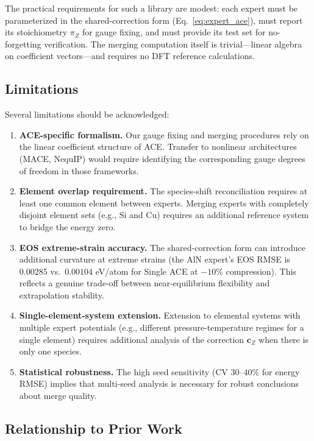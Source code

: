 \documentclass[twoside,prb,aps,floatfix,superscriptaddress,longbibliography]{revtex4-2}
\newcommand{\cZ}{\mathbf{c}_{Z}}
\begin{document}
The practical requirements for such a library are modest: each expert must be parameterized in the shared-correction form (Eq.~\eqref{eq:expert_ace}), must report its stoichiometry $\pi_Z$ for gauge fixing, and must provide its test set for no-forgetting verification. The merging computation itself is trivial---linear algebra on coefficient vectors---and requires no DFT reference calculations.

\subsection{Limitations}

Several limitations should be acknowledged:

\begin{enumerate}
    \item \textbf{ACE-specific formalism.} Our gauge fixing and merging procedures rely on the linear coefficient structure of ACE. Transfer to nonlinear architectures (MACE, NequIP) would require identifying the corresponding gauge degrees of freedom in those frameworks.
    \item \textbf{Element overlap requirement.} The species-shift reconciliation requires at least one common element between experts. Merging experts with completely disjoint element sets (e.g., Si and Cu) requires an additional reference system to bridge the energy zero.
    \item \textbf{EOS extreme-strain accuracy.} The shared-correction form can introduce additional curvature at extreme strains (the AlN expert's EOS RMSE is $0.00285$ vs.\ $0.00104$ eV/atom for Single ACE at $-10\%$ compression). This reflects a genuine trade-off between near-equilibrium flexibility and extrapolation stability.
    \item \textbf{Single-element-system extension.} Extension to elemental systems with multiple expert potentials (e.g., different pressure-temperature regimes for a single element) requires additional analysis of the correction $\cZ$ when there is only one species.
    \item \textbf{Statistical robustness.} The high seed sensitivity (CV $30$--$40\%$ for energy RMSE) implies that multi-seed analysis is necessary for robust conclusions about merge quality.
\end{enumerate}

\subsection{Relationship to Prior Work}
\end{document}
